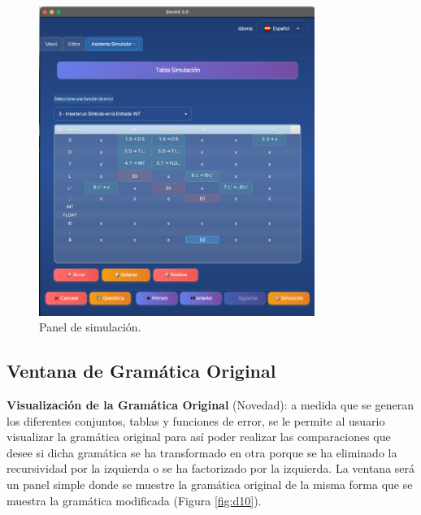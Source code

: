 \begin{figure}[htp]
\centering
	\includegraphics[width=0.8\textwidth]{figuras2/simulador/paso5_tablaPredictivaCompleta.png}
	\caption{Panel de simulación.}
	\label{fig:d6}
\end{figure}

\subsection{Ventana de Gramática Original}

\textbf{Visualización de la Gramática Original} (Novedad): a medida que se generan los diferentes conjuntos, tablas y funciones de error, se le permite al usuario visualizar la gramática original para así poder realizar las comparaciones que desee si dicha gramática se ha transformado en otra porque se ha eliminado la recursividad por la izquierda o se ha factorizado por la izquierda. La ventana será un panel simple donde se muestre la gramática original de la misma forma que se muestra la gramática modificada (Figura \ref{fig:d10}).

